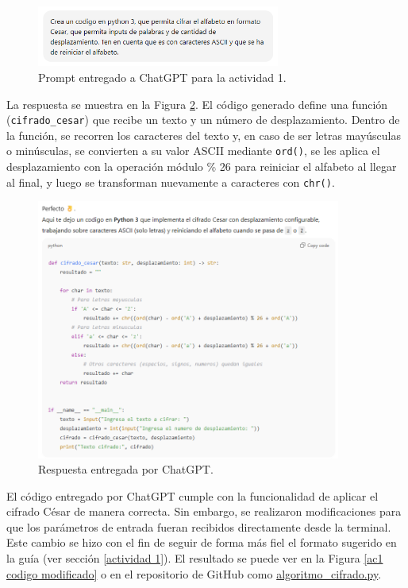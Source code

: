 \documentclass[letter,12pt]{article}
\begin{document}
\begin{figure}[H]
        \centering
        \includegraphics[width=8cm]{actividades/ac1/chatgpt_prompt.png}
        \caption{Prompt entregado a ChatGPT para la actividad 1.}
        \label{ac1 chatgpt prompt}
\end{figure}

La respuesta se muestra en la Figura \ref{ac1 chatgpt respuesta}. El código generado define una función (\verb|cifrado_cesar|) que recibe un texto y un número de desplazamiento. Dentro de la función, se recorren los caracteres del texto y, en caso de ser letras mayúsculas o minúsculas, se convierten a su valor ASCII mediante \verb|ord()|, se les aplica el desplazamiento con la operación módulo \% 26 para reiniciar el alfabeto al llegar al final, y luego se transforman nuevamente a caracteres con \verb|chr()|.

\begin{figure}[H]
    \centering
    \includegraphics[width=10cm]{actividades/ac1/chatgpt_respuesta.png}
    \caption{Respuesta entregada por ChatGPT.}
    \label{ac1 chatgpt respuesta}
\end{figure}

El código entregado por ChatGPT cumple con la funcionalidad de aplicar el cifrado César de manera correcta. Sin embargo, se realizaron modificaciones para que los parámetros de entrada fueran recibidos directamente desde la terminal. Este cambio se hizo con el fin de seguir de forma más fiel el formato sugerido en la guía (ver sección \ref{actividad 1}). 
El resultado se puede ver en la Figura \ref{ac1 codigo modificado} o en el repositorio de GitHub como \href{https://github.com/BrunoTrone1/cripto_lab1/blob/main/algoritmo_cifrado.py}{algoritmo\_cifrado.py}.
\end{document}
